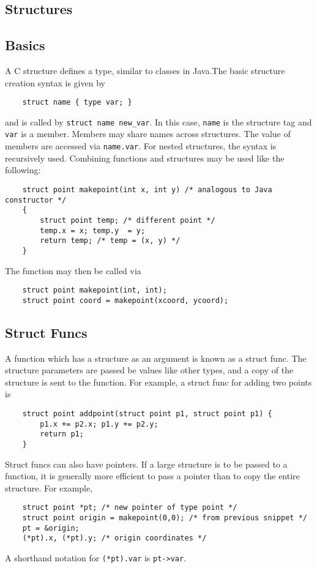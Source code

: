 \documentclass{tufte-book}
\begin{document}
\begin{fullwidth}
\chapter{Structures}
\section{Basics}
A C structure defines a type, similar to classes in Java.The basic structure creation syntax is given by
\begin{lstlisting}
    struct name { type var; }
\end{lstlisting}
and is called by \lstinline{struct name new_var}. In this case, \lstinline{name} is the structure tag and \lstinline{var} is a member. Members may share names across structures. The value of members are accessed via \lstinline{name.var}. For nested structures, the syntax is recursively used. Combining functions and structures may be used like the following:
\begin{lstlisting}
    struct point makepoint(int x, int y) /* analogous to Java constructor */
    {
        struct point temp; /* different point */
        temp.x = x; temp.y  = y;
        return temp; /* temp = (x, y) */
    }
\end{lstlisting}
The function may then be called via
\begin{lstlisting}
    struct point makepoint(int, int);
    struct point coord = makepoint(xcoord, ycoord);
\end{lstlisting}

\section{Struct Funcs}
A function which has a structure as an argument is known as a struct func. The structure parameters are passed be values like other types, and a copy of the structure is sent to the function. For example, a struct func for adding two points is
\begin{lstlisting}
    struct point addpoint(struct point p1, struct point p1) {
        p1.x += p2.x; p1.y += p2.y;
        return p1;
    }
\end{lstlisting}
Struct funcs can also have pointers. If a large structure is to be passed to a function, it is generally more efficient to pass a pointer than to copy the entire structure. For example,
\begin{lstlisting}
    struct point *pt; /* new pointer of type point */
    struct point origin = makepoint(0,0); /* from previous snippet */
    pt = &origin;
    (*pt).x, (*pt).y; /* origin coordinates */
\end{lstlisting}
A shorthand notation for \lstinline{(*pt).var} is \lstinline{pt->var}.


\end{fullwidth}
\end{document}
